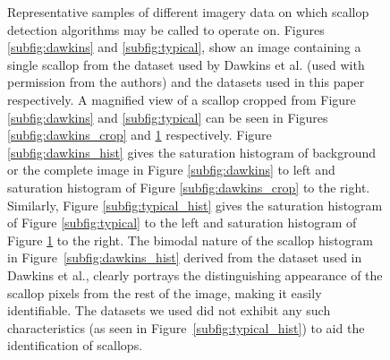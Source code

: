 \documentclass {udthesis}
\begin{document}
\begin{figure}
\begin{minipage}[c]{\textwidth}
\begin{subfigure}[]{0.235\textwidth}
	\caption{}
	\label{subfig:typical_crop}
	\hskip 15pt
    \end{subfigure}
  \end{minipage}
  \caption[Comparision of scallop recognition results with existing methods]{Representative samples of different imagery data on which
  scallop detection algorithms may be called to operate on.  Figures \ref{subfig:dawkins}
  and \ref{subfig:typical},
  show an image containing a single scallop from the dataset used by Dawkins et al.\cite{dawkings13} (used with permission from the authors) 
  and the datasets used in this paper respectively.
  A magnified
  view of a scallop cropped from Figure \ref{subfig:dawkins} 
  and \ref{subfig:typical} can be seen in Figures \ref{subfig:dawkins_crop} 
  and \ref{subfig:typical_crop} respectively.
  Figure \ref{subfig:dawkins_hist} 
  gives the saturation histogram of background or the complete 
  image in Figure \ref{subfig:dawkins} to left and 
  saturation histogram of Figure \ref{subfig:dawkins_crop} to the right.
  Similarly, Figure \ref{subfig:typical_hist} 
  gives the saturation histogram of Figure \ref{subfig:typical} to the left and 
  saturation histogram of Figure \ref{subfig:typical_crop} to the right. The bimodal 
  nature of the scallop histogram
  in Figure~\ref{subfig:dawkins_hist} 
  derived from the dataset used in Dawkins et al.\cite{dawkings13}, clearly portrays the distinguishing appearance of the scallop pixels from the rest of the image, making it easily identifiable. The datasets we
  used did not exhibit any such characteristics (as seen in Figure~\ref{subfig:typical_hist}) 
  to aid the identification of scallops.}
  \label{data-difference} 
\end{figure}
\end{document}
